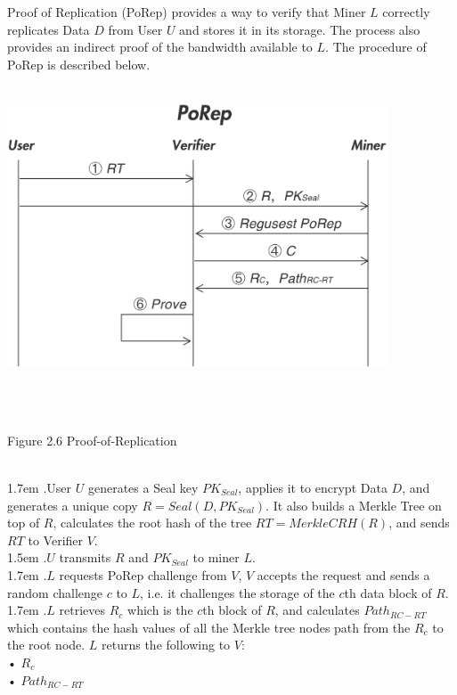 \documentclass[10pt,a4paper]{article}
\begin{document}
Proof of Replication (PoRep) provides a way to verify that Miner $L$ correctly replicates Data $D$ from User $U$ and stores it in its storage. The process also provides an indirect proof of the bandwidth available to $L$. The procedure of PoRep is described below.
\vspace{-0.8em}
\\ \\ 
\centerline{\includegraphics[width=320pt]{fig6}}
\\ \\\centerline{{Figure 2.6 Proof-of-Replication}}
\vspace{-1.5em}
\\

\hangindent 1.7em
.\quad User $U$ generates a Seal key $PK_{Seal}$, applies it to encrypt Data $D$, and generates a unique copy $R=Seal(D, PK_{Seal})$. It also builds a Merkle Tree on top of $R$, calculates the root hash of the tree $RT=MerkleCRH(R)$, and sends $RT$ to Verifier $V$.
\vspace{-0.8em}
\\

\hangindent 1.5em
.\quad $U$ transmits $R$ and $PK_{Seal}$ to miner $L$.
\vspace{-0.8em}
\\

\hangindent 1.7em
.\quad $L$ requests PoRep challenge from $V$, $V$ accepts the request and sends a random challenge $c$ to $L$, i.e. it challenges the storage of the $c$th data block of $R$.
\vspace{-0.8em}
\\

\hangindent 1.7em
.\quad $L$ retrieves $R_{c}$ which is the $c$th block of $R$, and calculates $Path_{RC-RT}$ which contains the hash values of all the Merkle tree nodes path from the $R_{c}$ to the root node. $L$ returns the following to $V$:
\\•   $R_{c}$\\ 
     •  $Path_{RC-RT}$
     \vspace{-0.5em}
\\
\end{document}

